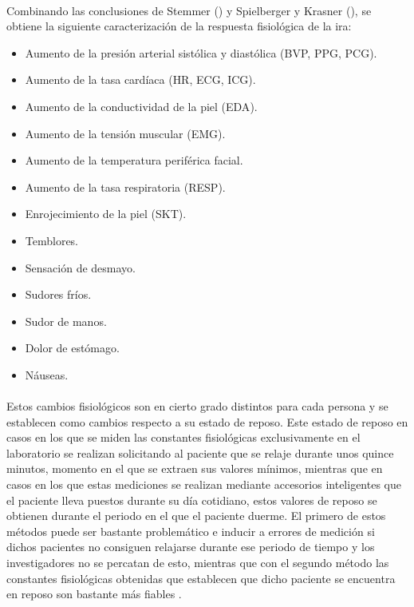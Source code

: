 \paragraph{}
Combinando las conclusiones de Stemmer (\citeyear{stemmler2010somatovisceral}) y Spielberger y Krasner (\citeyear{spielberger1988}), se obtiene la siguiente caracterización de la respuesta fisiológica de la ira:
\begin{itemize}
    \item Aumento de la presión arterial sistólica y diastólica (\ac{BVP}, \ac{PPG}, \ac{PCG}).
    \item Aumento de la tasa cardíaca (\ac{HR}, \ac{ECG}, \ac{ICG}).
    \item Aumento de la conductividad de la piel (\ac{EDA}).
    \item Aumento de la tensión muscular (\ac{EMG}).
    \item Aumento de la temperatura periférica facial.
    \item Aumento de la tasa respiratoria (\ac{RESP}).
    \item Enrojecimiento de la piel (\ac{SKT}).
    \item Temblores.
    \item Sensación de desmayo.
    \item Sudores fríos.
    \item Sudor de manos.
    \item Dolor de estómago.
    \item Náuseas.
\end{itemize}

\paragraph{}
Estos cambios fisiológicos son en cierto grado distintos para cada persona y se establecen como cambios respecto a su estado de reposo. Este estado de reposo en casos en los que se miden las constantes fisiológicas exclusivamente en el laboratorio se realizan solicitando al paciente que se relaje durante unos quince minutos, momento en el que se extraen sus valores mínimos, mientras que en casos en los que estas mediciones se realizan mediante accesorios inteligentes que el paciente lleva puestos durante su día cotidiano, estos valores de reposo se obtienen durante el periodo en el que el paciente duerme. El primero de estos métodos puede ser bastante problemático e inducir a errores de medición si dichos pacientes no consiguen relajarse durante ese periodo de tiempo y los investigadores no se percatan de esto, mientras que con el segundo método las constantes fisiológicas obtenidas que establecen que dicho paciente se encuentra en reposo son bastante más fiables \citep{peter2005wearable}.

